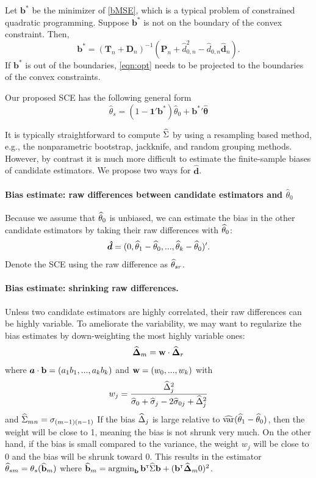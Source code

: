 \documentclass{article}
\begin{document}
Let $\mathbf b^*$ be the minimizer of \eqref{bMSE}, which is a typical problem of constrained quadratic programming. Suppose $\mathbf b^*$ is not on the boundary of the convex constraint. Then, 
\begin{equation} \label{eqn:opt}
\mathbf b^* =  (\mathbf T_n + \mathbf D_n)^{-1}(\mathbf P_n +\hat d_{0,n}^2 -\hat d_{0,n}\hat{\mathbf d}_n).
\end{equation}
If $\mathbf b^*$ is out of the boundaries, \eqref{eqn:opt} needs to be projected to the boundaries of the convex constraints.  

Our proposed SCE has the following general form
\begin{equation}
\hat\theta_s  = (1-\mathbf 1'\mathbf b^*) \hat\theta_0 + \mathbf {b^*}' \boldsymbol{\hat\theta}
\end{equation}

It is typically straightforward to compute ${\widehat\Sigma}$ by using a resampling based method, e.g., the nonparametric bootstrap, jackknife, and random grouping methods.  However, by contrast it is much more difficult to estimate the finite-sample biases of candidate estimators.  We propose two ways for $\boldsymbol {\hat d}$.

\paragraph{Bias estimate: raw differences between candidate estimators and $\hat \theta_0$}
Because we assume that ${\widehat\theta}_0$ is unbiased, we can estimate the bias in the other candidate estimators by taking their raw differences with ${\widehat\theta}_0$:
\[
\boldsymbol{\hat d} = (0, {\widehat\theta}_1 - {\widehat\theta}_0, ..., {\widehat\theta}_k - {\widehat\theta}_0)'.
\]
Denote the SCE using the raw difference as  ${\widehat\theta}_{sr}$.

\paragraph{Bias estimate: shrinking raw differences.}
Unless two candidate estimators are highly correlated, their raw differences can be highly variable. To ameliorate the variability, we may want to regularize the bias estimates by down-weighting the most highly variable ones: 
\[
{\widehat{\boldsymbol{\Delta}}}_m = {\bf w} \cdot {\widehat{\boldsymbol{\Delta}}}_r
\]
where ${\mbox{\boldmath$a$}} \cdot {\bf b} = (a_1b_1, ..., a_kb_k)$ and ${\bf w} = (w_0, ..., w_k)$ with
\[
w_j = \frac{{\widehat\Delta}_j^2}{{\widehat\sigma}_0 + {\widehat\sigma}_j - 2{\widehat\sigma}_{0j} + {\widehat\Delta}_j^2}
\]
and ${\widehat\Sigma}_{mn} = \sigma_{(m-1)(n-1)}$
If the bias ${\widehat\Delta}_j$ is large relative to $\widehat{\mbox{var}}({\widehat\theta}_1 - {\widehat\theta}_0)$, then the weight will be close to 1, meaning the bias is not shrunk very much. On the other hand, if the bias is small compared to the variance, the weight $w_j$ will be close to 0 and the bias will be shrunk toward 0. This results in the estimator ${\widehat\theta}_{sm} = \theta_s({\widehat {{\bf b}}}_m)$ where ${\widehat {{\bf b}}}_m = \mathop{\mbox{argmin}}_{{\bf b}}{\bf b}^{{\sf \scriptscriptstyle{T}}}{\widehat\Sigma}{\bf b} + ({\bf b}^{{\sf \scriptscriptstyle{T}}} {\widehat{\boldsymbol{\Delta}}}_m0)^2$.
\end{document}
